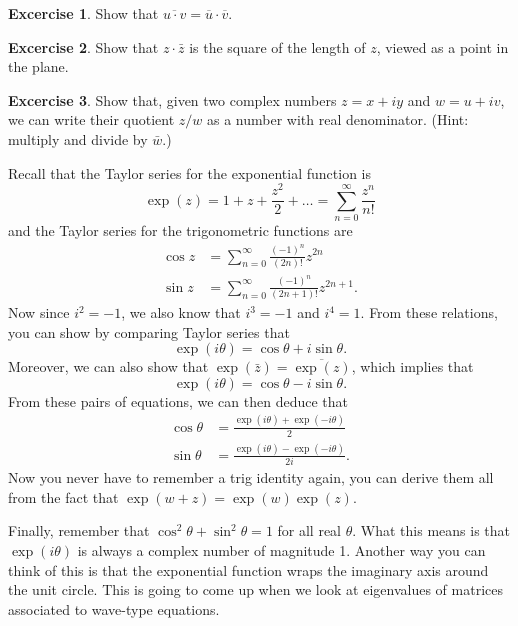 \documentclass{article}
\theoremstyle{definition}
\newtheorem*{exc}{Excercise}
\theoremstyle{plain}
\begin{document}
\begin{exc} Show that $\overline{u\cdot v} = \overline{u}\cdot\overline{v}$.\end{exc}
\begin{exc}Show that $z\cdot\bar z$ is the square of the length of $z$, viewed as a point in the plane.\end{exc}
\begin{exc}Show that, given two complex numbers $z = x + iy$ and $w = u + iv$, we can write their quotient $z / w$ as a number with real denominator. (Hint: multiply and divide by $\bar w$.)\end{exc}

Recall that the Taylor series for the exponential function is
\begin{equation}
    \exp(z) = 1 + z + \frac{z^2}{2} + \ldots = \sum_{n = 0}^\infty\frac{z^n}{n!}
\end{equation}
and the Taylor series for the trigonometric functions are
\begin{align}
    \cos z & = \sum_{n = 0}^\infty\frac{(-1)^n}{(2n)!}z^{2n} \\
    \sin z & = \sum_{n = 0}^\infty\frac{(-1)^n}{(2n + 1)!}z^{2n + 1}.
\end{align}
Now since $i^2 = -1$, we also know that $i^3 = -1$ and $i^4 = 1$.
From these relations, you can show by comparing Taylor series that
\begin{equation}
    \exp(i\theta) = \cos\theta + i\sin\theta.
\end{equation}
Moreover, we can also show that $\exp(\bar z) = \overline{\exp(z)}$, which implies that
\begin{equation}
    \exp(i\theta) = \cos\theta - i\sin\theta.
\end{equation}
From these pairs of equations, we can then deduce that
\begin{align}
    \cos\theta & = \frac{\exp(i\theta) + \exp(-i\theta)}{2} \\
    \sin\theta & = \frac{\exp(i\theta) - \exp(-i\theta)}{2i}.
\end{align}
Now you never have to remember a trig identity again, you can derive them all from the fact that $\exp(w + z) = \exp(w)\exp(z)$.

Finally, remember that $\cos^2\theta + \sin^2\theta = 1$ for all real $\theta$.
What this means is that $\exp(i\theta)$ is always a complex number of magnitude 1.
Another way you can think of this is that the exponential function wraps the imaginary axis around the unit circle.
This is going to come up when we look at eigenvalues of matrices associated to wave-type equations.
\end{document}
